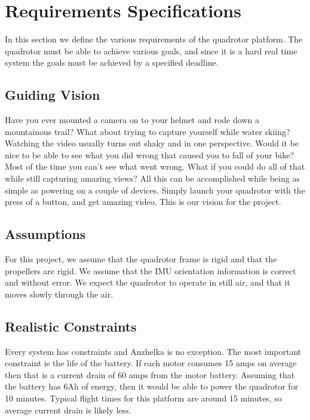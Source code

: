 \documentclass{article}
\numberwithin{equation}{section} %
\begin{document}
\section{Requirements Specifications}
In this section we define the various requirements of the quadrotor platform. The quadrotor must be able to achieve various goals, and since it is a hard real time system the goals must be achieved by a specified deadline.


\subsection{Guiding Vision}
Have you ever mounted a camera on to your helmet and rode down a mountainous trail? What about trying to capture yourself while water skiing? Watching the video usually turns out shaky and in one perspective. Would it be nice to be able to see what you did wrong that caused you to fall of your bike? Most of the time you can't see what went wrong. What if you could do all of that while still capturing amazing views?  All this can be accomplished while being as simple as powering on a couple of devices. Simply launch your quadrotor with the press of a button, and get amazing video. This is our vision for the project.

\subsection{Assumptions}
For this project, we assume that the quadrotor frame is rigid and that the propellers are rigid. We assume that the IMU orientation information is correct and without error. We expect the quadrotor to operate in still air, and that it moves slowly through the air.

\subsection{Realistic Constraints}
Every system has constraints and Anzhelka is no exception. The most important constraint is the life of the battery. If each motor consumes 15 amps on average then that is a current drain of 60 amps from the motor battery. Assuming that the battery has 6Ah of energy, then it would be able to power the quadrotor for 10 minutes. Typical flight times for this platform are around 15 minutes, so average current drain is likely less.
\end{document}

